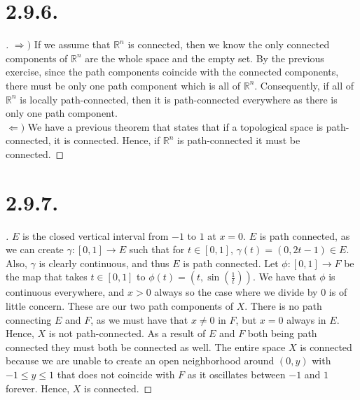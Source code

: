 \documentclass{article}
\begin{document}
\section*{2.9.6.}
\begin{proof}[\unskip\nopunct]
$\Rightarrow)$ If we assume that $\mathbb{R}^n$ is connected, then we know the only connected components of $\mathbb{R}^n$ are the whole space and the empty set. By the previous exercise, since the path components coincide with the connected components, there must be only one path component which is all of $\mathbb{R}^n$. 
Consequently, if all of $\mathbb{R}^n$ is locally path-connected, then it is path-connected everywhere
as there is only one path component. \\
$\Leftarrow)$ We have a previous theorem that states that if a topological space is path-connected, it is connected.
Hence, if $\mathbb{R}^n$ is path-connected it must be connected. 
\end{proof}

\section*{2.9.7.}
\begin{proof}[\unskip\nopunct]
    $E$ is the closed vertical interval from $-1$ to $1$ at $x = 0$. $E$ is path connected, as we can create $\gamma:[0, 1] \to E$ such that for $t \in [0, 1]$, $\gamma(t) = (0, 2t - 1) \in E$. Also, $\gamma$ is clearly continuous, and thus $E$ is path connected. Let $\phi:[0, 1] \to F$ be the map that takes $t \in [0, 1]$ to $\phi(t) =\left(t, \sin \left(\frac{1}{t}\right)\right) $. 
    We have that $\phi$ is continuous everywhere, and $x > 0$ always so the case where we divide by $0$ is of little concern. These are our two path components of $X$. There is no path connecting $E$ and $F$, as we must have that $x \neq 0$ in $F$, but $x = 0$ always in $E$. Hence, $X$ is not path-connected. 
    As a result of $E$ and $F$ both being path connected
    they must both be connected as well. 
    The entire space $X$ is connected because we are unable to create an open neighborhood around $(0, y)$ with $-1  \leq y \leq 1$ that does not coincide with $F$ as it oscillates between $-1$ and $1$ forever. Hence, $X$ is connected. 
\end{proof}
\end{document}
